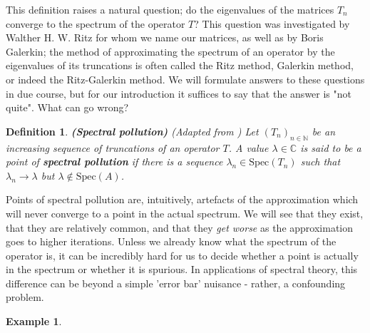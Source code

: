 \documentclass{article}
\newtheorem*{definition}{Definition}
\newtheorem{example}{Example}
\newcommand{\Spec}{\text{Spec}} %
\newcommand{\1}{\mathbf{1}} %
\begin{document}
This definition raises a natural question; do the eigenvalues of the matrices $T_n$ converge to the spectrum of the operator $T$? This question was investigated by Walther H. W. Ritz for whom we name our matrices, as well as by Boris Galerkin; the method of approximating the spectrum of an operator by the eigenvalues of its truncations is often called the Ritz method, Galerkin method, or indeed the Ritz-Galerkin method. We will formulate answers
to these questions in due course, but for our introduction it suffices to say that the answer is "not quite". What can go wrong?

\begin{definition}{\textbf{(Spectral pollution)}}
(Adapted from \parencite{davies2004spectral})
Let $(T_n)_{n \in \mathbb{N}}$ be an increasing sequence of truncations of an operator $T$. A value $\lambda \in \mathbb{C}$ is said to be a point of \textbf{spectral pollution} if there is a sequence $\lambda_n \in \Spec(T_n)$ such that $\lambda_n \rightarrow \lambda$ but $\lambda \notin \Spec(A)$.
\end{definition}

Points of spectral pollution are, intuitively, artefacts of the approximation which will never converge to a point in the actual spectrum. We will see that they exist, that they are relatively common, and that they \emph{get worse} as the approximation goes to higher iterations. Unless we already
know what the spectrum of the operator is, it can be incredibly hard for us to decide whether a point is actually in the spectrum or whether it is
spurious. In applications of spectral theory, this difference can be beyond a simple 'error bar' nuisance - rather, a confounding problem.

\begin{example}
\end{example}

\printbibliography
\printindex
\end{document}
